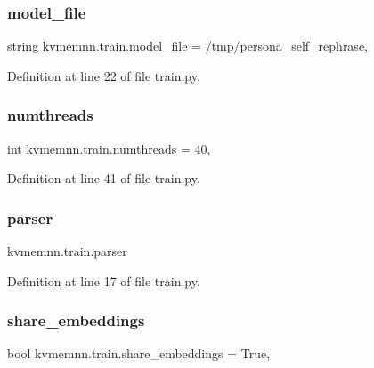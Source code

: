 \subsubsection{\texorpdfstring{model\+\_\+file}{model\_file}}
{\footnotesize\ttfamily string kvmemnn.\+train.\+model\+\_\+file = \textquotesingle{}/tmp/persona\+\_\+self\+\_\+rephrase\textquotesingle{},}



Definition at line 22 of file train.\+py.

\mbox{\label{namespacekvmemnn_1_1train_a3e923c01d54806105d4bf273e071a90e}} 
\subsubsection{\texorpdfstring{numthreads}{numthreads}}
{\footnotesize\ttfamily int kvmemnn.\+train.\+numthreads = 40,}



Definition at line 41 of file train.\+py.

\mbox{\label{namespacekvmemnn_1_1train_ae5f5c954c5bd240b7abaf43df88b8249}} 
\subsubsection{\texorpdfstring{parser}{parser}}
{\footnotesize\ttfamily kvmemnn.\+train.\+parser}



Definition at line 17 of file train.\+py.

\mbox{\label{namespacekvmemnn_1_1train_aee2de861c3cf276c1ab32ebd5580d61b}} 
\subsubsection{\texorpdfstring{share\+\_\+embeddings}{share\_embeddings}}
{\footnotesize\ttfamily bool kvmemnn.\+train.\+share\+\_\+embeddings = True,}




